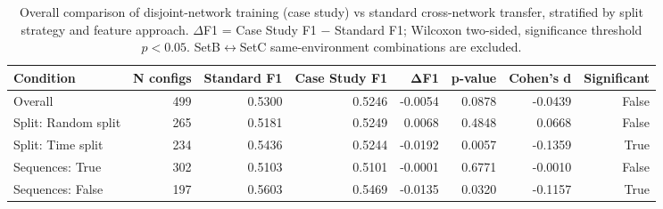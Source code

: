 \begin{table}
\caption{Overall comparison of disjoint-network training (case study) vs standard cross-network transfer, stratified by split strategy and feature approach. $\Delta$F1 = Case Study F1 $-$ Standard F1; Wilcoxon two-sided, significance threshold $p<0.05$. SetB$\leftrightarrow$SetC same-environment combinations are excluded.}
\label{tab:q6_overall}
\begin{tabular}{lrrrrrrr}
\toprule
Condition & N configs & Standard F1 & Case Study F1 & ΔF1 & p-value & Cohen's d & Significant \\
\midrule
Overall & 499 & 0.5300 & 0.5246 & -0.0054 & 0.0878 & -0.0439 & False \\
Split: Random split & 265 & 0.5181 & 0.5249 & 0.0068 & 0.4848 & 0.0668 & False \\
Split: Time split & 234 & 0.5436 & 0.5244 & -0.0192 & 0.0057 & -0.1359 & True \\
Sequences: True & 302 & 0.5103 & 0.5101 & -0.0001 & 0.6771 & -0.0010 & False \\
Sequences: False & 197 & 0.5603 & 0.5469 & -0.0135 & 0.0320 & -0.1157 & True \\
\bottomrule
\end{tabular}
\end{table}
